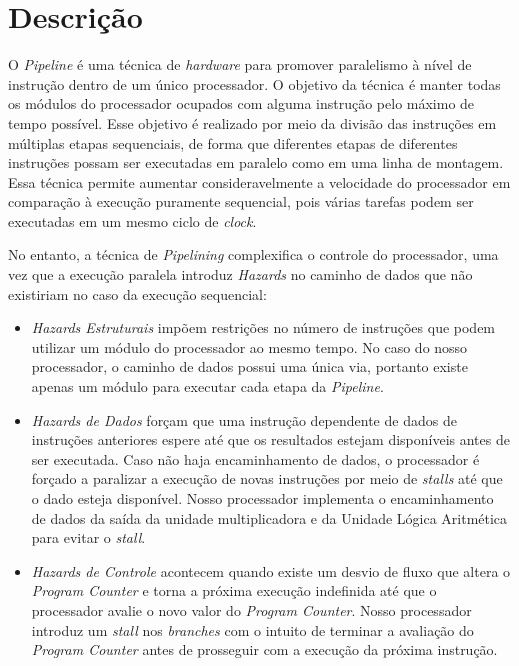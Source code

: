 \documentclass[11pt,a4paper,titlepage]{article}
\begin{document}
\section{Descrição}\label{sec:desc}

O \textit{Pipeline} é uma técnica de \textit{hardware} para promover paralelismo
à nível de instrução dentro de um único processador. O objetivo da técnica é 
manter todas os módulos do processador ocupados com alguma instrução pelo
máximo de tempo possível. Esse objetivo é realizado por meio da divisão das 
instruções em múltiplas etapas sequenciais, de forma que diferentes etapas de
diferentes instruções possam ser executadas em paralelo como em uma linha de 
montagem. Essa técnica permite aumentar consideravelmente a velocidade do processador
em comparação à execução puramente sequencial, pois várias tarefas podem ser
executadas em um mesmo ciclo de \textit{clock}.

No entanto, a técnica de \textit{Pipelining} complexifica o controle do 
processador, uma vez que a execução paralela introduz \textit{Hazards} no caminho
de dados que não existiriam no caso da execução sequencial:

\begin{itemize}

\item \textit{Hazards Estruturais} impõem restrições no número de instruções que podem
utilizar um módulo do processador ao mesmo tempo. No caso do nosso processador,
o caminho de dados possui uma única via, portanto existe apenas um módulo para 
executar cada etapa da \textit{Pipeline}. 

\item \textit{Hazards de Dados} forçam que uma instrução dependente de dados
de instruções anteriores espere até que os resultados estejam disponíveis antes
de ser executada. Caso não haja encaminhamento de dados, o processador é forçado
a paralizar a execução de novas instruções por meio de \textit{stalls} até que
o dado esteja disponível. Nosso processador implementa o encaminhamento de dados
da saída da unidade multiplicadora e da Unidade Lógica Aritmética para evitar
o \textit{stall}.

\item \textit{Hazards de Controle} acontecem quando existe um desvio de fluxo
que altera o \textit{Program Counter} e torna a próxima execução indefinida até
que o processador avalie o novo valor do \textit{Program Counter}. Nosso processador
introduz um \textit{stall} nos \textit{branches} com o intuito de terminar a 
avaliação do \textit{Program Counter} antes de prosseguir com a execução da próxima
instrução.

\end{itemize}
\end{document}
